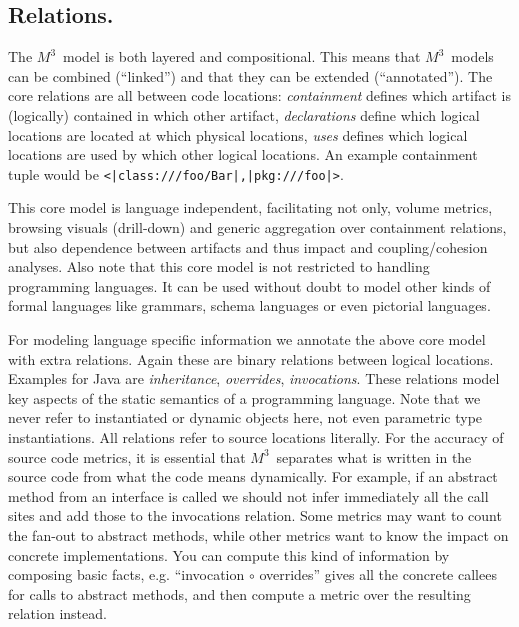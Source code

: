 \documentclass[a4]{IEEEtran}
\newcommand{\loc}[1]{\small{\texttt{#1}}}
\newcommand{\mthree}{\ensuremath{M^3}}
\begin{document}
\subsection{Relations.} The \mthree\  model is both layered and compositional. This means that \mthree\ models can be combined (``linked'') and that they can be extended (``annotated''). The core relations are all between code locations: \emph{containment} defines which artifact is (logically) contained in which other artifact, \emph{declarations} define which logical locations are located at which physical locations, \emph{uses} defines which logical locations are used by which other logical locations.
An example containment tuple would be \loc{<|class:///foo/Bar|,|pkg:///foo|>}.

This core model is language independent, facilitating not only, volume metrics, browsing visuals (drill-down) and generic aggregation over containment relations, but also dependence between artifacts and thus impact and coupling/cohesion analyses. Also note that this core model is not restricted to handling programming languages. It can be used without doubt to model other kinds of formal languages like grammars, schema languages or even pictorial languages.

For modeling language specific information we annotate the above core model with extra relations. Again these are binary relations between logical locations. Examples for Java are \emph{inheritance}, \emph{overrides}, \emph{invocations}. These relations model key aspects of the static semantics of a programming language. Note that we never refer to instantiated or dynamic objects here, not even parametric type instantiations. All relations refer to source locations literally. For the accuracy of source code metrics, it is essential that \mthree\  separates what is written in the source code from what the code means dynamically. For example, if an abstract method from an interface is called we should not infer immediately all the call sites and add those to the invocations relation. Some metrics may want to count the fan-out to abstract methods, while other metrics want to know the impact on concrete implementations. You can compute this kind of information by composing basic facts, e.g. ``invocation $\circ$ overrides'' gives all the concrete callees for calls to abstract methods, and then compute a metric over the resulting relation instead.
\end{document}

